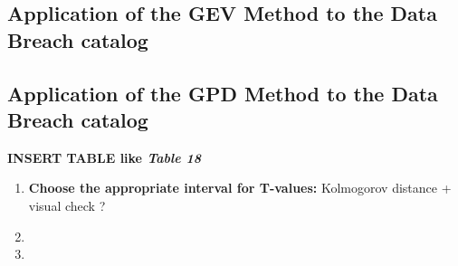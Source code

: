 \subsection{Application of the GEV Method to the Data Breach catalog}


\subsection{Application of the GPD Method to the Data Breach catalog}

{\bf INSERT TABLE like {\it Table 18}}

\begin{enumerate}
  \item {\bf Choose the appropriate interval for T-values: } Kolmogorov distance + visual check ?
  \item 
  \item 
\end{enumerate}



